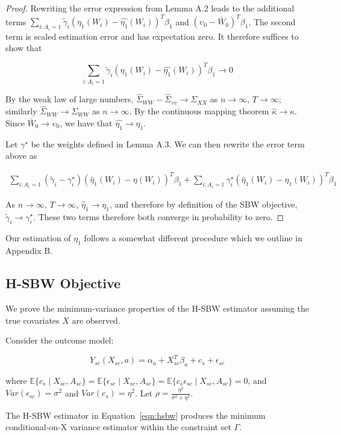 \begin{proof}

Rewriting the error expression from Lemma A.2 leads to the additional terms $\sum_{i: A_i = 1}\tilde{\gamma}_i(\eta_1(W_i) - \hat{\eta_1}(W_i))^T\beta_1$ and $(\upsilon_0 - \bar{W}_0)^T\beta_1$. The second term is scaled estimation error and has expectation zero. It therefore suffices to show that 

$$
\sum_{i: A_i = 1}\tilde{\gamma}_i(\eta_1(W_i) - \hat{\eta_1}(W_i))^T\beta_1 \to 0
$$

By the weak law of large numbers, $\hat{\Sigma}_{WW} - \hat{\Sigma}_{vv} \to \Sigma_{XX}$ as $n \to \infty$, $T \to \infty$; similarly $\hat{\Sigma}_{WW} \to \Sigma_{WW}$ as $n \to \infty$. By the continuous mapping theorem $\hat{\kappa} \to \kappa$. Since $\bar{W}_0 \to \upsilon_0$, we have that $\hat{\eta_1} \to \eta_1$. 

Let $\gamma^\star$ be the weights defined in Lemma A.3. We can then rewrite the error term above as

\begin{align*}
\sum_{i: A_i = 1}(\tilde{\gamma}_i - \gamma_i^\star)(\hat{\eta}_1(W_i) - \eta(W_i))^T\beta_1 + \sum_{i: A_i = 1}\gamma_i^\star(\hat{\eta}_1(W_i) - \eta_1(W_i))^T\beta_1
\end{align*}

As $n \to \infty$, $T \to \infty$, $\hat{\eta}_1 \to \eta_1$, and therefore by definition of the SBW objective, $\tilde{\gamma}_i \to \gamma_i^\star$. These two terms therefore both converge in probability to zero. 

\end{proof}

Our estimation of $\eta_1$ follows a somewhat different procedure which we outline in Appendix B.

\subsection{H-SBW Objective}

We prove the minimum-variance properties of the H-SBW estimator assuming the true covariates $X$ are observed.

\begin{proposition}
    Consider the outcome model:

\begin{equation}
    Y_{sc}(X_{sc}, a) = \alpha_a + X_{sc}^T\beta_a + c_s + \epsilon_{sc}
\end{equation}

where $\mathbb{E}\{c_s \mid X_{sc}, A_{sc}\} = \mathbb{E}\{\epsilon_{sc} \mid X_{sc}, A_{sc}\} = \mathbb{E}\{c_s\epsilon_{sc} \mid X_{sc}, A_{sc}\} = 0$, and $Var(\epsilon_{sc}) = \sigma^2$ and $Var(c_s) = \eta^2$. Let $\rho = \frac{\eta^2}{\sigma^2 + \eta^2}$.

The H-SBW estimator in Equation~\ref{eqn:hsbw} produces the minimum conditional-on-X variance estimator within the constraint set $\Gamma$.
\end{proposition}

